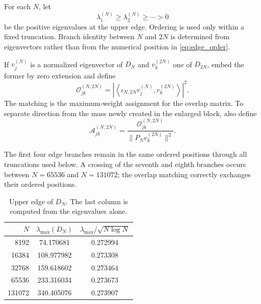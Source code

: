 \documentclass[11pt]{amsart}
\numberwithin{equation}{section}
\theoremstyle{plain}
\theoremstyle{definition}
\theoremstyle{remark}
\begin{document}
For each $N$, let
\begin{equation}
\lambda_1^{(N)}\ge\lambda_2^{(N)}\ge\cdots>0
\label{eq:edge_order}
\end{equation}
be the positive eigenvalues at the upper edge.  Ordering is used only within a fixed truncation.  Branch identity between $N$ and $2N$ is determined from eigenvectors rather than from the numerical position in \eqref{eq:edge_order}.

If $v_j^{(N)}$ is a normalized eigenvector of $D_N$ and $v_k^{(2N)}$ one of $D_{2N}$, embed the former by zero extension and define
\begin{equation}
\mathcal O_{jk}^{(N,2N)}
=
\left|
\left\langle
\iota_{N,2N}v_j^{(N)},v_k^{(2N)}
\right\rangle
\right|^2.
\label{eq:branch_overlap}
\end{equation}
The matching is the maximum-weight assignment for the overlap matrix.  To separate direction from the mass newly created in the enlarged block, also define
\begin{equation}
\mathcal A_{jk}^{(N,2N)}
=
\frac{\mathcal O_{jk}^{(N,2N)}}
{\|P_Nv_k^{(2N)}\|^2}.
\label{eq:branch_alignment}
\end{equation}

The first four edge branches remain in the same ordered positions through all truncations used below.  A crossing of the seventh and eighth branches occurs between $N=65536$ and $N=131072$; the overlap matching correctly exchanges their ordered positions.

\begin{table}[htbp]
\centering
\caption{Upper edge of $D_N$.  The last column is computed from the eigenvalues alone.}
\label{tab:edge_growth}
\begin{tabular}{rcc}
\toprule
$N$ & $\lambda_{\max}(D_N)$ & $\lambda_{\max}/\sqrt{N\log N}$\\
\midrule
8192   & 74.170681 & 0.272994\\
16384  & 108.977982 & 0.273308\\
32768  & 159.618602 & 0.273464\\
65536  & 233.316034 & 0.273673\\
131072 & 340.405076 & 0.273907\\
\bottomrule
\end{tabular}
\end{table}
\end{document}
